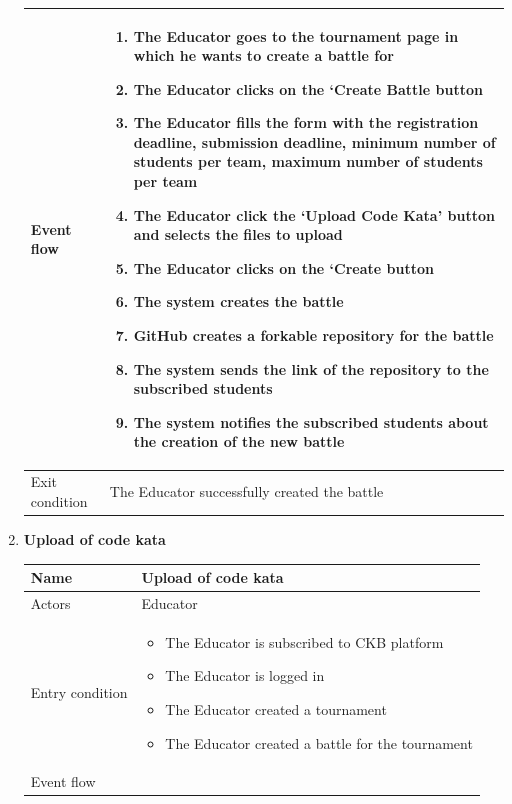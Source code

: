 \begin{enumerate}[label=UC\arabic*:]
\begin{tabular}{|p{3cm}|p{8cm}|}
        \hline
        Event flow & 
        \begin{enumerate}[label=\arabic*.]
            \item The Educator goes to the tournament page in which he wants to create a battle for
            \item The Educator clicks on the `Create Battle button
            \item The Educator fills the form with the registration deadline, submission deadline, minimum number of students per team, maximum number of students per team
            \item The Educator click the `Upload Code Kata' button and selects the files to upload
            \item The Educator clicks on the `Create button
            \item The system creates the battle
            \item GitHub creates a forkable repository for the battle
            \item The system sends the link of the repository to the subscribed students
            \item The system notifies the subscribed students about the creation of the new battle
        \end{enumerate}
        \\
        \hline
        Exit condition & The Educator successfully created the battle \\
        \hline
    \end{tabular}
    \item \textbf{Upload of code kata} \\
    \begin{tabular}{|p{3cm}|p{8cm}|}
        \hline
        Name & Upload of code kata \\
        \hline
        Actors & Educator \\
        \hline
        Entry condition &
        \begin{itemize}
            \item The Educator is subscribed to CKB platform
            \item The Educator is logged in
            \item The Educator created a tournament
            \item The Educator created a battle for the tournament
        \end{itemize}
        \\
        \hline
        Event flow &

\end{tabular}
\end{enumerate}
